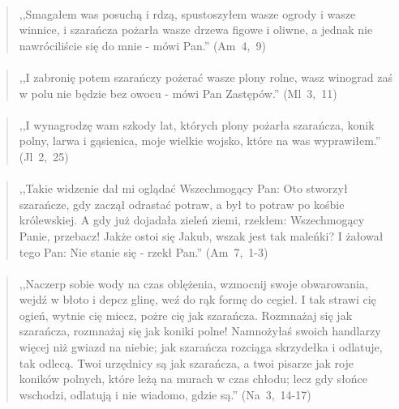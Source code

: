 \documentclass[10pt,a4paper,oneside]{article}
\begin{document}
\paragraph{}
\begin{quote}
,,Smagałem was posuchą i rdzą, spustoszyłem wasze ogrody i wasze winnice, i szarańcza pożarła wasze drzewa figowe i oliwne, a jednak nie nawróciliście się do mnie - mówi Pan.'' \mbox{(Am 4, 9)}
\end{quote}
\paragraph{}
\begin{quote}
,,I zabronię potem szarańczy pożerać wasze plony rolne, wasz winograd zaś w polu nie będzie bez owocu - mówi Pan Zastępów.'' \mbox{(Ml 3, 11)}
\end{quote}
\paragraph{}
\begin{quote}
,,I wynagrodzę wam szkody lat, których plony pożarła szarańcza, konik polny, larwa i gąsienica, moje wielkie wojsko, które na was wyprawiłem.'' \mbox{(Jl 2, 25)}
\end{quote}
\paragraph{}
\begin{quote}
,,Takie widzenie dał mi oglądać Wszechmogący Pan: Oto stworzył szarańcze, gdy zaczął odrastać potraw, a był to potraw po kośbie królewskiej. A gdy już dojadała zieleń ziemi, rzekłem: Wszechmogący Panie, przebacz! Jakże ostoi się Jakub, wszak jest tak maleńki? I żałował tego Pan: Nie stanie się - rzekł Pan.'' \mbox{(Am 7, 1-3)}
\end{quote}
\paragraph{}
\begin{quote}
,,Naczerp sobie wody na czas oblężenia, wzmocnij swoje obwarowania, wejdź w błoto i depcz glinę, weź do rąk formę do cegieł. I tak strawi cię ogień, wytnie cię miecz, pożre cię jak szarańcza. Rozmnażaj się jak szarańcza, rozmnażaj się jak koniki polne! Namnożyłaś swoich handlarzy więcej niż gwiazd na niebie; jak szarańcza rozciąga skrzydełka i odlatuje, tak odlecą. Twoi urzędnicy są jak szarańcza, a twoi pisarze jak roje koników polnych, które leżą na murach w czas chłodu; lecz gdy słońce wschodzi, odlatują i nie wiadomo, gdzie są.'' \mbox{(Na 3, 14-17)}
\end{quote}
\end{document}
